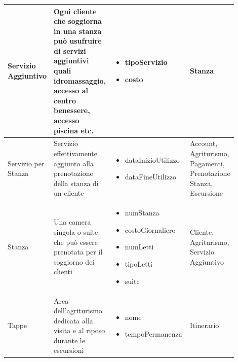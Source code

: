 \documentclass[12pt,a4paper]{article}
\begin{document}
\begin{center}
\begin{longtable}{|p{0.14\linewidth}|p{0.20\linewidth}|p{0.36\linewidth}|p{0.20\linewidth}|}
\hline
Servizio Aggiuntivo				 	&  Ogni cliente che soggiorna in una stanza può usufruire di servizi aggiuntivi quali idromassaggio, accesso al centro benessere, accesso piscina etc. 
					& \begin{itemize}
						\setlength{\itemindent}{-1em}
						\vspace{-25pt}
						\setlength\itemsep{-0.25em}
						\item tipoServizio
						\item costo
					\end{itemize}
					&  Stanza  \\ 

\hline
Servizio per Stanza				 	&  Servizio effettivamente aggiunto alla prenotazione della stanza di un cliente 
					& \begin{itemize}
						\setlength{\itemindent}{-1em}
						\vspace{-25pt}
						\setlength\itemsep{-0.25em}
						\item dataInizioUtilizzo
						\item dataFineUtilizzo
					\end{itemize}
					&  Account, Agriturismo, Pagamenti, Prenotazione Stanza, Escursione  \\ 

\hline
Stanza				 	&  Una camera singola o suite che può essere prenotata per il soggiorno dei clienti 
					& \begin{itemize}
						\setlength{\itemindent}{-1em}
						\vspace{-25pt}
						\setlength\itemsep{-0.25em}
						\item numStanza
						\item costoGiornaliero
						\item numLetti
						\item tipoLetti
						\item suite
					\end{itemize}
					&  Cliente, Agriturismo, Servizio Aggiuntivo  \\ 

\hline
Tappe				 	&  Area dell'agriturismo dedicata alla visita e al riposo durante le escursioni 
					& \begin{itemize}
						\setlength{\itemindent}{-1em}
						\vspace{-25pt}
						\setlength\itemsep{-0.25em}
						\item nome
						\item tempoPermanenza
					\end{itemize}
					&  Itinerario  \\ 

\hline


\end{longtable}
\end{center}
\pagebreak
\end{document}
